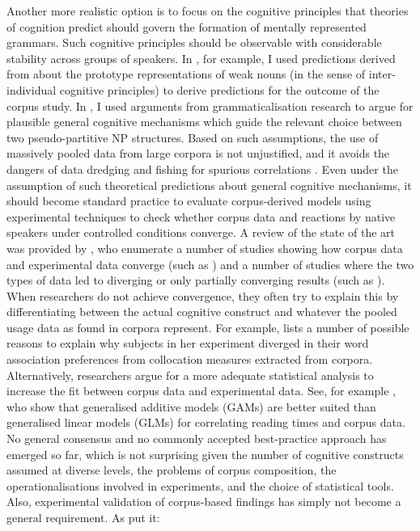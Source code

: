 Another more realistic option is to focus on the cognitive principles that theories of cognition predict should govern the formation of mentally represented grammars.
Such cognitive principles should be observable with considerable stability across groups of speakers.
In \ROWeakN, for example, I used predictions derived from \citet{Koepcke1995} about the prototype representations of weak nouns (in the sense of inter-individual cognitive principles) to derive predictions for the outcome of the corpus study.
In \ROMeasure, I used arguments from grammaticalisation research \citep{Koptjevskaja2001} to argue for plausible general cognitive mechanisms which guide the relevant choice between two pseudo-partitive NP structures.
Based on such assumptions, the use of massively pooled data from large corpora is not unjustified, and it avoids the dangers of data dredging and fishing for spurious correlations \citep{GoodHardin2012}.
Even under the assumption of such theoretical predictions about general cognitive mechanisms, it should become standard practice to evaluate corpus-derived models using experimental techniques to check whether corpus data and reactions by native speakers under controlled conditions converge.
A review of the state of the art was provided by \cite{NewmanSorensenduncan2015}, who enumerate a number of studies showing how corpus data and experimental data converge (such as \citealt{BresnanEa2007,DurrantDoherty2010,GriesWulff2005,GriesEa2005}) and a number of studies where the two types of data led to diverging or only partially converging results (such as \citealt{ArppeJaervikivi2007,Dabrowska2014,Mollin2009}).
When researchers do not achieve convergence, they often try to explain this by differentiating between the actual cognitive construct and whatever the pooled usage data as found in corpora represent.
For example, \citet[411]{Dabrowska2014} lists a number of possible reasons to explain why subjects in her experiment diverged in their word association preferences from collocation measures extracted from corpora.
Alternatively, researchers argue for a more adequate statistical analysis to increase the fit between corpus data and experimental data.
See, for example \cite{DivjakEa2016}, who show that generalised additive models (GAMs) are better suited than generalised linear models (GLMs) for correlating reading times and corpus data. 
No general consensus and no commonly accepted best-practice approach has emerged so far, which is not surprising given the number of cognitive constructs assumed at diverse levels, the problems of corpus composition, the operationalisations involved in experiments, and the choice of statistical tools.
Also, experimental validation of corpus-based findings has simply not become a general requirement.
As \citet[3--4]{DivjakEa2016a} put it:

